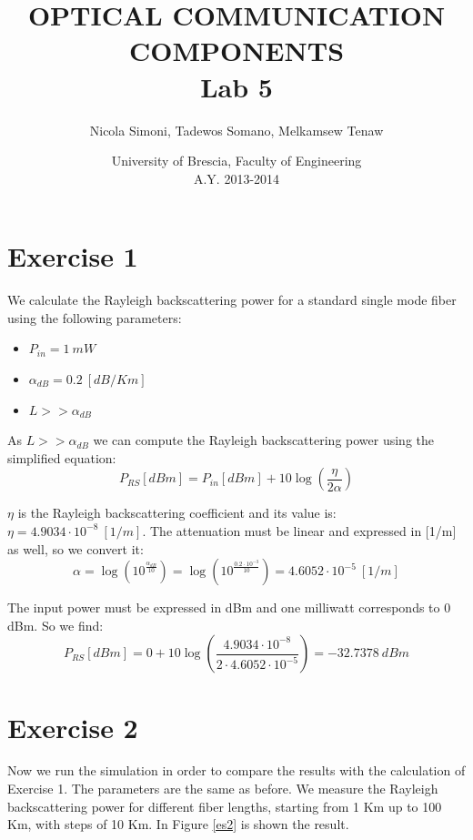 \documentclass[a4paper,10pt]{report}
\title{\textbf{OPTICAL COMMUNICATION COMPONENTS \\ Lab 5}}
\author{Nicola Simoni, Tadewos Somano, Melkamsew Tenaw}
\date{University of Brescia, Faculty of Engineering\\A.Y. 2013-2014}
\begin{document}
\maketitle


\section*{Exercise 1}
We calculate the Rayleigh backscattering power for a standard single mode fiber using the following parameters:
\begin{itemize}
 \item $P_{in} = 1 \ mW$
 \item $\alpha_{dB} = 0.2 \ [dB/Km]$
 \item $L >> \alpha_{dB}$
\end{itemize}

As $L >> \alpha_{dB}$ we can compute the Rayleigh backscattering power using the simplified equation:
$$P_{RS}[dBm]=P_{in}[dBm]+10 \log \left( \frac{\eta}{2 \alpha} \right)$$

$\eta$ is the Rayleigh backscattering coefficient and its value is: $\eta = 4.9034\cdot 10^{-8} \ [1/m]$.
The attenuation must be linear and expressed in [1/m] as well, so we convert it:
$$ \alpha = \log \left( 10^{\frac{\alpha_{dB}}{10}} \right) = \log \left( 10^{\frac{0.2 \cdot 10^{-3}}{10}} \right)= 4.6052\cdot 10^{-5} \ [1/m]$$

The input power must be expressed in dBm and one milliwatt corresponds to 0 dBm.
So we find:
$$P_{RS}[dBm]= 0 + 10 \log \left( \frac{4.9034\cdot 10^{-8}}{2 \cdot 4.6052\cdot 10^{-5}} \right)= -32.7378 \ dBm$$

\section*{Exercise 2}
Now we run the simulation in order to compare the results with the calculation of Exercise 1.
The parameters are the same as before. We measure the Rayleigh backscattering power for different fiber lengths, starting from 1 Km up to 100 Km, with
steps of 10 Km. In Figure \ref{es2} is shown the result.
\end{document}
